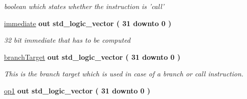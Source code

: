 \begin{DoxyCompactItemize}
\begin{DoxyCompactList}\small\item\em boolean which states whether the instruction is 'call' \end{DoxyCompactList}\item 
\hypertarget{class_o_f_unit_ad63c399e5906690f784966193e1f33f1}{\hyperlink{class_o_f_unit_ad63c399e5906690f784966193e1f33f1}{immediate}  {\bfseries {\bfseries \textcolor{vhdlkeyword}{out}\textcolor{vhdlchar}{ }}} {\bfseries \textcolor{comment}{std\-\_\-logic\-\_\-vector}\textcolor{vhdlchar}{ }\textcolor{vhdlchar}{(}\textcolor{vhdlchar}{ } \textcolor{vhdldigit}{31} \textcolor{vhdlchar}{ }\textcolor{vhdlchar}{ }\textcolor{vhdlchar}{ }\textcolor{vhdlkeyword}{downto}\textcolor{vhdlchar}{ }\textcolor{vhdlchar}{ }\textcolor{vhdlchar}{ } \textcolor{vhdldigit}{0} \textcolor{vhdlchar}{ }\textcolor{vhdlchar}{)}\textcolor{vhdlchar}{ }} }\label{class_o_f_unit_ad63c399e5906690f784966193e1f33f1}

\begin{DoxyCompactList}\small\item\em 32 bit immediate that has to be computed \end{DoxyCompactList}\item 
\hypertarget{class_o_f_unit_a0d338d7f0493ce29501b3eb557de0a67}{\hyperlink{class_o_f_unit_a0d338d7f0493ce29501b3eb557de0a67}{branch\-Target}  {\bfseries {\bfseries \textcolor{vhdlkeyword}{out}\textcolor{vhdlchar}{ }}} {\bfseries \textcolor{comment}{std\-\_\-logic\-\_\-vector}\textcolor{vhdlchar}{ }\textcolor{vhdlchar}{(}\textcolor{vhdlchar}{ } \textcolor{vhdldigit}{31} \textcolor{vhdlchar}{ }\textcolor{vhdlchar}{ }\textcolor{vhdlchar}{ }\textcolor{vhdlkeyword}{downto}\textcolor{vhdlchar}{ }\textcolor{vhdlchar}{ }\textcolor{vhdlchar}{ } \textcolor{vhdldigit}{0} \textcolor{vhdlchar}{ }\textcolor{vhdlchar}{)}\textcolor{vhdlchar}{ }} }\label{class_o_f_unit_a0d338d7f0493ce29501b3eb557de0a67}

\begin{DoxyCompactList}\small\item\em This is the branch target which is used in case of a branch or call instruction. \end{DoxyCompactList}\item 
\hypertarget{class_o_f_unit_a923e4330bf1a7966baa0589fb6b397e6}{\hyperlink{class_o_f_unit_a923e4330bf1a7966baa0589fb6b397e6}{op1}  {\bfseries {\bfseries \textcolor{vhdlkeyword}{out}\textcolor{vhdlchar}{ }}} {\bfseries \textcolor{comment}{std\-\_\-logic\-\_\-vector}\textcolor{vhdlchar}{ }\textcolor{vhdlchar}{(}\textcolor{vhdlchar}{ } \textcolor{vhdldigit}{31} \textcolor{vhdlchar}{ }\textcolor{vhdlchar}{ }\textcolor{vhdlchar}{ }\textcolor{vhdlkeyword}{downto}\textcolor{vhdlchar}{ }\textcolor{vhdlchar}{ }\textcolor{vhdlchar}{ } \textcolor{vhdldigit}{0} \textcolor{vhdlchar}{ }\textcolor{vhdlchar}{)}\textcolor{vhdlchar}{ }} }\label{class_o_f_unit_a923e4330bf1a7966baa0589fb6b397e6}


\end{DoxyCompactItemize}
